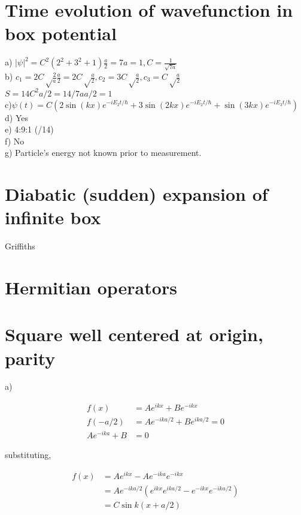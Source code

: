 \documentclass{article}
\title{}
\date{}
\newcommand{\<}{\langle}
\renewcommand{\>}{\rangle}
\begin{document}
\maketitle

\section{Time evolution of wavefunction in box potential}

a) $|\psi|^2 = C^2 (2^2 + 3^2 + 1)\frac{a}{2} = 7a = 1, C = \frac{1}{\sqrt{7a}}$
\\
b) $c_1 = 2C\sqrt\frac{2}{a} \frac{a}{2} = 2C\sqrt\frac{a}{2}, c_2 = 3C\sqrt\frac{a}{2}, c_3 = C\sqrt\frac{a}{2}$
\\
$S = 14C^2 a/2 = 14/7a a/2 = 1$
\\
c)$\psi(t) = C(2\sin(kx)e^{-iE_2t/\hbar} + 3\sin(2kx)e^{-iE_2t/\hbar} + \sin(3kx)e^{-iE_3t/\hbar})$
\\
d) Yes
\\
e) 4:9:1 (/14)
\\
f) No
\\
g) Particle's energy not known prior to measurement.

\section{Diabatic (sudden) expansion of infinite box}

Griffiths

\section{Hermitian operators}

\section{Square well centered at origin, parity}

a)

\begin{align*}
f(x) &= Ae^{ikx} + Be^{-ikx} \\
f(-a/2) &= Ae^{-ika/2} + Be^{ika/2} = 0 \\
Ae^{-ika} + B &= 0
\end{align*}

substituting,

\begin{align*}
f(x) &= Ae^{ikx} - Ae^{-ika}e^{-ikx} \\
&= Ae^{-ika/2}(e^{ikx}e^{ika/2} - e^{-ikx}e^{-ika/2}) \\
&= C\sin k(x+a/2)
\end{align*}
\end{document}
